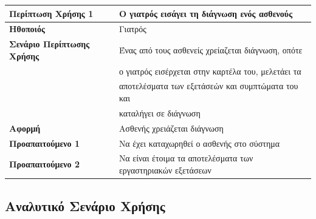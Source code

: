 \documentclass{article}
\newcommand\T{\rule{0pt}{2.6ex}}       %
\newcommand\B{\rule[-1.2ex]{0pt}{0pt}}
\begin{document}
\begin{center}
     \begin{tabular}{|l|l|}
     \hline
      \textbf{Περίπτωση Χρήσης 1} & Ο γιατρός εισάγει τη διάγνωση ενός ασθενούς \T\B \\ 
      \hline
      \textbf{Ηθοποιός} & Γιατρός \T\B \\
      \hline
      \textbf{Σενάριο Περίπτωσης Χρήσης} & Ένας από τους ασθενείς χρείαζεται διάγνωση, οπότε \T\\& ο γιατρός εισέρχεται στην καρτέλα του, μελετάει τα\\& αποτελέσματα των εξετάσεών και συμπτώματα του και \\& καταλήγει σε διάγνωση \B \\
      \hline
      \textbf{Αφορμή} & Ασθενής χρειάζεται διάγνωση \T\B \\
      \hline
      \textbf{Προαπαιτούμενο 1} & Να έχει καταχωρηθεί ο ασθενής στο σύστημα \T\B \\
      \hline
      \textbf{Προαπαιτούμενο 2} & Να είναι έτοιμα τα αποτελέσματα των εργαστηριακών εξετάσεων \T\B \\
      \hline
     \end{tabular}
 \end{center}
 
 \subsection{Αναλυτικό Σενάριο Χρήσης}
 
\end{document}

